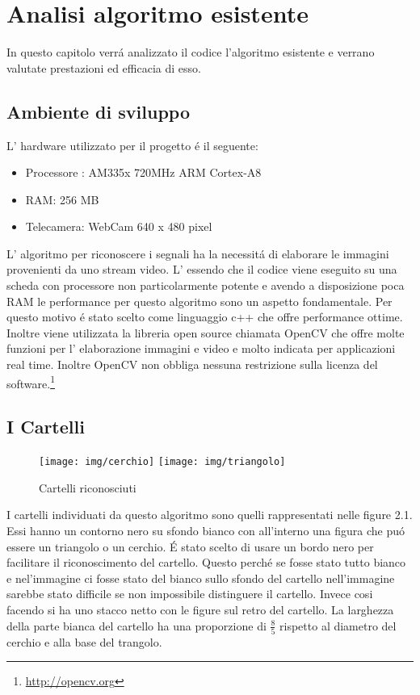 \chapter{Analisi algoritmo esistente}

In questo capitolo verr\'a analizzato il codice l'algoritmo esistente e verrano valutate prestazioni ed efficacia di esso.


\section{Ambiente di sviluppo}

	L' hardware utilizzato per il progetto \'e il seguente:
	\begin{itemize}
	\item Processore : AM335x 720MHz ARM Cortex-A8
	\item RAM: 256 MB
	\item Telecamera: WebCam 640 x 480 pixel
	\end{itemize}

	L' algoritmo per riconoscere i segnali ha la necessit\'a di elaborare le immagini provenienti da uno stream video. L' essendo che il codice viene eseguito su una scheda con processore non particolarmente potente e avendo a disposizione poca RAM le performance per questo algoritmo sono un aspetto fondamentale. Per questo motivo \'e stato scelto come linguaggio c++ che offre performance ottime. Inoltre viene utilizzata la libreria open source chiamata OpenCV che offre molte funzioni per l' elaborazione immagini e video e molto indicata per applicazioni real time. Inoltre OpenCV non obbliga nessuna restrizione sulla licenza del software.\footnote{\url{http://opencv.org}}

\section{I Cartelli}
	\begin{figure}[!ht]
		\centering
		\texttt{[image: img/cerchio]}
		\texttt{[image: img/triangolo]}
		\caption{Cartelli riconosciuti}
	\end{figure}
	I cartelli individuati da questo algoritmo sono quelli rappresentati nelle figure 2.1.
	Essi hanno un contorno nero su sfondo bianco con all'interno una figura che pu\'o essere un triangolo o un cerchio.
	\'E stato scelto di usare un bordo nero per facilitare il riconoscimento del cartello. Questo perch\'e se fosse stato tutto bianco e nel'immagine ci fosse stato del bianco sullo sfondo del cartello nell'immagine sarebbe stato difficile se non impossibile distinguere il cartello. Invece cosi facendo si ha uno stacco netto con le figure sul retro del cartello. La larghezza della parte bianca del cartello ha una proporzione di $\tfrac{8}{5}$ rispetto al diametro del cerchio e alla base del trangolo.


